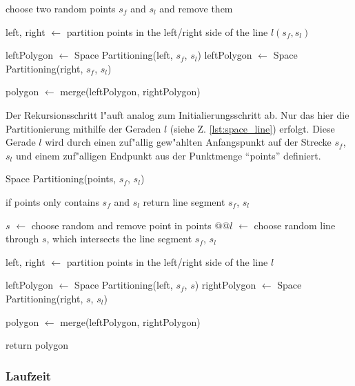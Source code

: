 

\begin{code}[caption={Space Partioning}, mathescape=true]
choose two random points $s_f$ and $s_l$ and remove them

left, right $\leftarrow$ partition points in the left/right side of the line $l(s_f, s_l)$

leftPolygon $\leftarrow$ Space Partitioning(left, $s_f$, $s_l$)
leftPolygon $\leftarrow$ Space Partitioning(right, $s_f$, $s_l$)

polygon $\leftarrow$ merge(leftPolygon, rightPolygon)
\end{code}

\noindent

Der Rekursionsschritt l"auft analog zum Initialierungsschritt ab. Nur das hier
die Partitionierung mithilfe der Geraden $l$ (siehe Z. \ref{lst:space_line}) erfolgt.
Diese Gerade $l$ wird durch einen zuf"allig gew"ahlten Anfangspunkt auf der Strecke
$s_f$, $s_l$ und einem zuf"alligen Endpunkt aus der Punktmenge ``points'' definiert.

\begin{code}[caption={Rekursion Space Partioning}, mathescape=true, escapeinside={@}{@}]
Space Partitioning(points, $s_f$, $s_l$)

  if points only contains $s_f$ and $s_l$
    return line segment $s_f$, $s_l$

  $s$ $\leftarrow$ choose random and remove point in points
  @\label{lst:space_line}@$l$ $\leftarrow$ choose random line through $s$, which intersects the line segment $s_f$, $s_l$

  left, right $\leftarrow$ partition points in the left/right side of the line $l$

  leftPolygon $\leftarrow$ Space Partitioning(left, $s_f$, $s$)
  rightPolygon $\leftarrow$ Space Partitioning(right, $s$, $s_l$)

  polygon $\leftarrow$ merge(leftPolygon, rightPolygon)

  return polygon
\end{code}

\subsubsection{Laufzeit}

